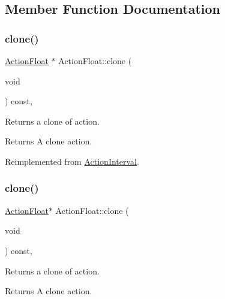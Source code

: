 \subsection{Member Function Documentation}
\mbox{\label{classActionFloat_aedf782fede49194ec2a70dfa06a18599}} 
\subsubsection{\texorpdfstring{clone()}{clone()}\hspace{0.1cm}{\footnotesize\ttfamily [1/2]}}
{\footnotesize\ttfamily \hyperlink{classActionFloat}{Action\+Float} $\ast$ Action\+Float\+::clone (\begin{DoxyParamCaption}\item[{void}]{ }\end{DoxyParamCaption}) const\hspace{0.3cm}{\ttfamily [override]}, {\ttfamily [virtual]}}

Returns a clone of action.

\begin{DoxyReturn}{Returns}
A clone action. 
\end{DoxyReturn}


Reimplemented from \hyperlink{classActionInterval_abc93ce0c2f54a90eb216a7803f25f44a}{Action\+Interval}.

\mbox{\label{classActionFloat_ac661a208d2c168b873ca8c5234433f90}} 
\subsubsection{\texorpdfstring{clone()}{clone()}\hspace{0.1cm}{\footnotesize\ttfamily [2/2]}}
{\footnotesize\ttfamily \hyperlink{classActionFloat}{Action\+Float}$\ast$ Action\+Float\+::clone (\begin{DoxyParamCaption}\item[{void}]{ }\end{DoxyParamCaption}) const\hspace{0.3cm}{\ttfamily [override]}, {\ttfamily [virtual]}}

Returns a clone of action.

\begin{DoxyReturn}{Returns}
A clone action. 
\end{DoxyReturn}


